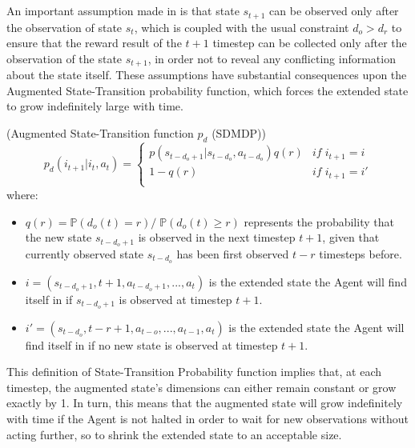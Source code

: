                 \\\\
                An important assumption made in  is that state $s_{t+1}$ can be observed only after the observation of state $s_t$, which is coupled with the usual constraint $d_o > d_r$ to ensure that the reward result of the $t+1$ timestep can be collected only after the observation of the state $s_{t+1}$, in order not to reveal any conflicting information about the state itself. These assumptions have substantial consequences upon the Augmented State-Transition probability function, which forces the extended state to grow indefinitely large with time.
                \begin{definition}(Augmented State-Transition function $p_d$ (SDMDP))
                    \label{def:sdmdpaugtrans}
                    \[ p_d \left( i_{t+1} | i_t, a_t \right) =  
                        \begin{cases} 
                            p \left( s_{t-d_o+1} | s_{t-d_o}, a_{t-d_o} \right) q\left(r\right) & if \; i_{t+1} = i \\
                            1 - q\left(r\right) & if \; i_{t+1} = i'\\
                        \end{cases}
                    \]
                    where:
                \end{definition}
                \begin{itemize}[topsep=0.5em, partopsep=0.5em]
                    \setlength\itemsep{0em}
                    \item $q(r) = \mathds{P}\left( d_o(t) = r \right) /\; \mathds{P}\left( d_o(t) \geq r \right) $ represents the probability that the new state $s_{t-d_o+1}$ is observed in the next timestep $t+1$, given that currently observed state $s_{t-d_o}$ has been first observed $t-r$ timesteps before.
                    \item $i = \left( s_{t-d_o+1}, t+1, a_{t-d_o+1}, ..., a_{t}\right)$ is the extended state the Agent will find itself in if $s_{t-d_o+1}$ is observed at timestep $t+1$.
                    \item $i' = \left( s_{t-d_o}, t-r+1, a_{t-o}, ..., a_{t-1}, a_{t} \right)$  is the extended state the Agent will find itself in if no new state is observed at timestep $t+1$.
                \end{itemize}
                This definition of State-Transition Probability function implies that, at each timestep, the augmented state's dimensions can either remain constant or grow exactly by 1. In turn, this means that the augmented state will grow indefinitely with time if the Agent is not halted in order to wait for new observations without acting further, so to shrink the extended state to an acceptable size.
